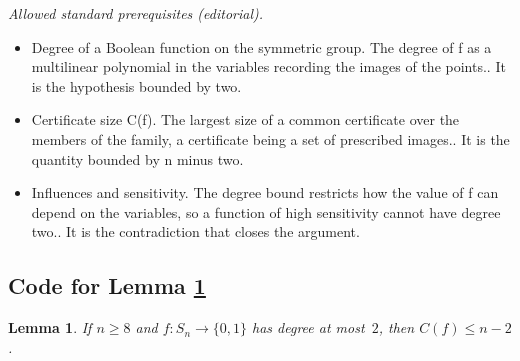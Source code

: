 \documentclass[10pt,a4paper]{article}
\newtheorem{lemma}[theorem]{Lemma}
\theoremstyle{definition}
\begin{document}
\noindent\textit{Allowed standard prerequisites (editorial).}\begin{itemize}
\item Degree of a Boolean function on the symmetric group. The degree of f as a multilinear polynomial in the variables recording the images of the points.. It is the hypothesis bounded by two.
\item Certificate size C(f). The largest size of a common certificate over the members of the family, a certificate being a set of prescribed images.. It is the quantity bounded by n minus two.
\item Influences and sensitivity. The degree bound restricts how the value of f can depend on the variables, so a function of high sensitivity cannot have degree two.. It is the contradiction that closes the argument.
\end{itemize}\medskip
\subsection{Code for Lemma \ref{lem:C-bound-sym}} \label{apx:C-bound-sym}

\begin{lemma} \label{lem:C-bound-sym}
If $n \geq 8$ and $f\colon S_n \to \{0,1\}$ has degree at most~$2$, then $C(f) \leq n-2$.
\end{lemma}
\end{document}
